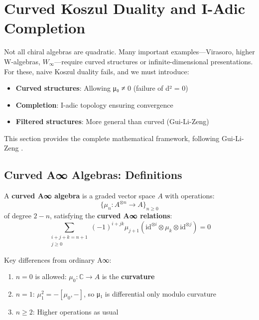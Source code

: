 \section{Curved Koszul Duality and I-Adic Completion}
\label{sec:curved-koszul-i-adic}

Not all chiral algebras are quadratic. Many important examples---Virasoro, higher W-algebras, 
$W_\infty$---require curved structures or infinite-dimensional presentations. For these, 
naive Koszul duality fails, and we must introduce:
\begin{itemize}
\item \textbf{Curved structures}: Allowing μ₀ ≠ 0 (failure of d² = 0)
\item \textbf{Completion}: I-adic topology ensuring convergence
\item \textbf{Filtered structures}: More general than curved (Gui-Li-Zeng)
\end{itemize}

This section provides the complete mathematical framework, following Gui-Li-Zeng \cite{GLZ22}.

\subsection{Curved A∞ Algebras: Definitions}
\label{sec:curved-ainfty-definition}

\begin{definition}
\label{def:curved-ainfty}
A \textbf{curved A∞ algebra} is a graded vector space $A$ with operations:
\begin{equation}
\{\mu_n: A^{\otimes n} \to A\}_{n \geq 0}
\end{equation}
of degree $2-n$, satisfying the \textbf{curved A∞ relations}:
\begin{equation}
\sum_{\substack{i+j+k=n+1\\ j \geq 0}} (-1)^{i+jk} \mu_{j+1}(\text{id}^{\otimes i} 
\otimes \mu_k \otimes \text{id}^{\otimes j}) = 0
\end{equation}

Key differences from ordinary A∞:
\begin{enumerate}
\item $n=0$ is allowed: $\mu_0: \mathbb{C} \to A$ is the \textbf{curvature}
\item $n=1$: $\mu_1^2 = -[\mu_0, -]$, so μ₁ is differential only modulo curvature
\item $n \geq 2$: Higher operations as usual
\end{enumerate}
\end{definition}

